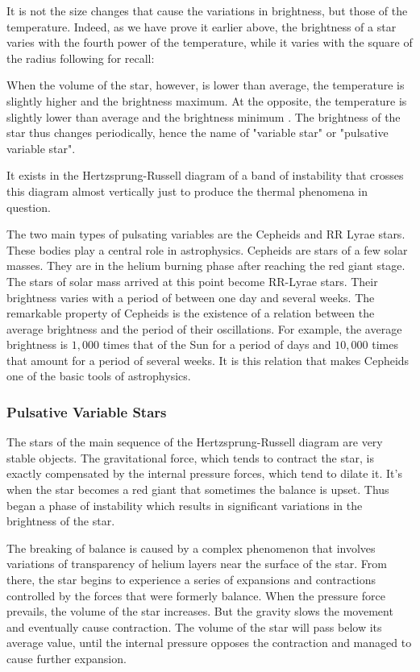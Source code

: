 	It is not the size changes that cause the variations in brightness, but those of the temperature. Indeed, as we have prove it earlier above, the brightness of a star varies with the fourth power of the temperature, while it varies with the square of the radius following for recall:
	
	When the volume of the star, however, is lower than average, the temperature is slightly higher and the brightness maximum. At the opposite, the temperature is slightly lower than average and the brightness minimum . The brightness of the star thus changes periodically, hence the name of "variable star" or "pulsative variable star".

	It exists in the Hertzsprung-Russell diagram of a band of instability that crosses this diagram almost vertically just to produce the thermal phenomena in question.

	The two main types of pulsating variables are the Cepheids and RR Lyrae stars. These bodies play a central role in astrophysics. Cepheids are stars of a few solar masses. They are in the helium burning phase after reaching the red giant stage. The stars of solar mass arrived at this point become RR-Lyrae stars. Their brightness varies with a period of between one day and several weeks. The remarkable property of Cepheids is the existence of a relation between the average brightness and the period of their oscillations. For example, the average brightness is $1,000$ times that of the Sun for a period of days and $10,000$ times that amount for a period of several weeks. It is this relation that makes Cepheids one of the basic tools of astrophysics.
	
	\subsubsection{Pulsative Variable Stars}
	The stars of the main sequence of the Hertzsprung-Russell diagram are very stable objects. The gravitational force, which tends to contract the star, is exactly compensated by the internal pressure forces, which tend to dilate it. It's when the star becomes a red giant that sometimes the balance is upset. Thus began a phase of instability which results in significant variations in the brightness of the star.

	The breaking of balance is caused by a complex phenomenon that involves variations of transparency of helium layers near the surface of the star. From there, the star begins to experience a series of expansions and contractions controlled by the forces that were formerly balance. When the pressure force prevails, the volume of the star increases. But the gravity slows the movement and eventually cause contraction. The volume of the star will pass below its average value, until the internal pressure opposes the contraction and managed to cause further expansion.

